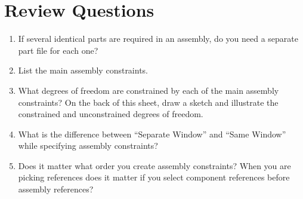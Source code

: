\documentclass[12pt]{article}
\begin{document}
\section*{Review Questions}
\begin{enumerate}
	\item If several identical parts are required in an assembly, do you need a separate part file for each one?
	\vspace{1.25in}
	\item List the main assembly constraints.
	\vspace{1.25in}
	\item What degrees of freedom are constrained by each of the main assembly constraints? On the back of this sheet, draw a sketch and illustrate the constrained and unconstrained degrees of freedom.
	\vspace{1.25in}
	\item What is the difference between ``Separate Window'' and ``Same Window'' while specifying assembly constraints?
	\vspace{1.25in}
	\item Does it matter what order you create assembly constraints? When you are picking references does it matter if you select component references before assembly references?
\end{enumerate}
\end{document}
